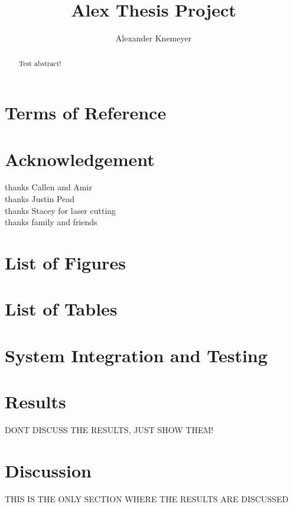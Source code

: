 \documentclass{article}
\begin{document}
\title{Alex Thesis Project}
\author{Alexander Knemeyer}

\maketitle
\section{Terms of Reference}

\section{Acknowledgement}
thanks Callen and Amir\\
thanks Justin Pead\\
thanks Stacey for laser cutting\\
thanks family and friends

\begin{abstract}
Test abstract!
\end{abstract}

\section{List of Figures}

\section{List of Tables}









\section{System Integration and Testing}

\section{Results}
DONT DISCUSS THE RESULTS, JUST SHOW THEM!

\section{Discussion}
THIS IS THE ONLY SECTION WHERE THE RESULTS ARE DISCUSSED
\end{document}
